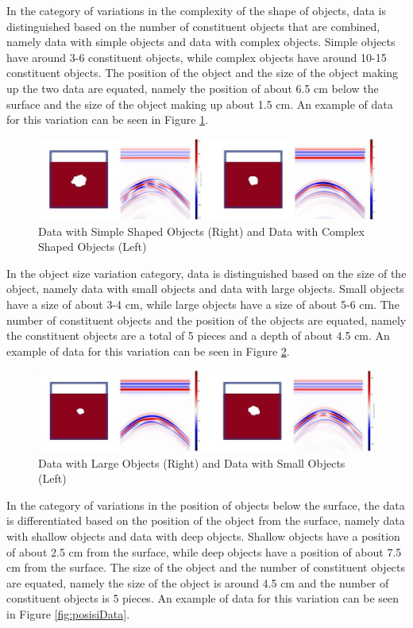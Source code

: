 \documentclass[conference]{IEEEtran}
\begin{document}
In the category of variations in the complexity of the shape of objects, data is distinguished based on the number of constituent objects that are combined, namely data with simple objects and data with complex objects.
Simple objects have around 3-6 constituent objects, while complex objects have around 10-15 constituent objects.
The position of the object and the size of the object making up the two data are equated, namely the position of about 6.5 cm below the surface and the size of the object making up about 1.5 cm.
An example of data for this variation can be seen in Figure \ref{fig:kompleksData}.

\begin{figure}[ht]
  \centering
  \includegraphics[scale=0.2]{gambar/variasi kompleksitas.png}
  \caption{Data with Simple Shaped Objects (Right) and Data with Complex Shaped Objects (Left)}
  \label{fig:kompleksData}
\end{figure}

In the object size variation category, data is distinguished based on the size of the object, namely data with small objects and data with large objects.
Small objects have a size of about 3-4 cm, while large objects have a size of about 5-6 cm.
The number of constituent objects and the position of the objects are equated, namely the constituent objects are a total of 5 pieces and a depth of about 4.5 cm.
An example of data for this variation can be seen in Figure \ref{fig:ukuranData}.

\begin{figure}[ht]
  \centering
  \includegraphics[scale=0.2]{gambar/variasi ukuran.png}
  \caption{Data with Large Objects (Right) and Data with Small Objects (Left)}
  \label{fig:ukuranData}
\end{figure}

In the category of variations in the position of objects below the surface, the data is differentiated based on the position of the object from the surface, namely data with shallow objects and data with deep objects.
Shallow objects have a position of about 2.5 cm from the surface, while deep objects have a position of about 7.5 cm from the surface.
The size of the object and the number of constituent objects are equated, namely the size of the object is around 4.5 cm and the number of constituent objects is 5 pieces.
An example of data for this variation can be seen in Figure \ref{fig:posisiData}.
\end{document}
